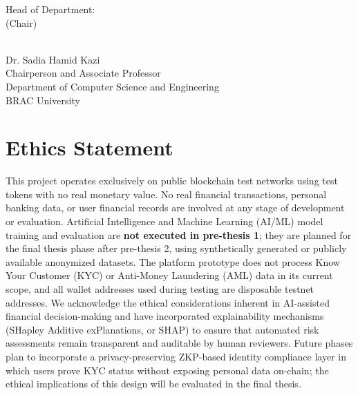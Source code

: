 \documentclass[12pt, a4paper]{report}
\begin{document}
\begin{flushleft}
Head of Department:\\
(Chair)
\end{flushleft}

\begin{flushright}
\vspace{-0.5cm}
\hrulefill\\
Dr. Sadia Hamid Kazi\\
Chairperson and Associate Professor\\
Department of Computer Science and Engineering\\
BRAC University
\end{flushright}

\vfill\null

\newpage
\thispagestyle{empty}

\chapter*{Ethics Statement}
{}

This project operates exclusively on public blockchain test networks using test tokens with no real monetary value. No real financial transactions, personal banking data, or user financial records are involved at any stage of development or evaluation. Artificial Intelligence and Machine Learning (AI/ML) model training and evaluation are \textbf{not executed in pre-thesis 1}; they are planned for the final thesis phase after pre-thesis 2, using synthetically generated or publicly available anonymized datasets. The platform prototype does not process Know Your Customer (KYC) or Anti-Money Laundering (AML) data in its current scope, and all wallet addresses used during testing are disposable testnet addresses. We acknowledge the ethical considerations inherent in AI-assisted financial decision-making and have incorporated explainability mechanisms (SHapley Additive exPlanations, or SHAP) to ensure that automated risk assessments remain transparent and auditable by human reviewers. Future phases plan to incorporate a privacy-preserving ZKP-based identity compliance layer in which users prove KYC status without exposing personal data on-chain; the ethical implications of this design will be evaluated in the final thesis.

\newpage
\thispagestyle{empty}
\end{document}

